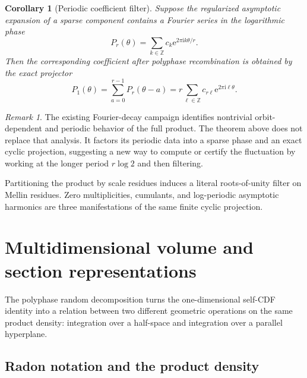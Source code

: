\documentclass[11pt,oneside]{article}
\numberwithin{equation}{section}
\newtheorem{corollary}[theorem]{Corollary}
\theoremstyle{definition}
\theoremstyle{remark}
\newtheorem{remark}[theorem]{Remark}
\newcommand{\Z}{\mathbb Z}
\newcommand{\e}{\mathrm e}
\newcommand{\ii}{\mathrm i}
\begin{document}
\begin{corollary}[Periodic coefficient filter]
\label{cor:periodic-filter}
Suppose the regularized asymptotic expansion of a sparse component contains a
Fourier series in the logarithmic phase
\begin{equation}
 P_r(\theta)=\sum_{k\in\Z}c_k\e^{2\pi\ii k\theta/r}.        \label{eq:Pr-phase}
\end{equation}
Then the corresponding coefficient after polyphase recombination is obtained
by the exact projector
\begin{equation}
 P_1(\theta)=\sum_{a=0}^{r-1}P_r(\theta-a)
 =r\sum_{\ell\in\Z}c_{r\ell}\e^{2\pi\ii\ell\theta}.       \label{eq:phase-projector}
\end{equation}
\end{corollary}

\begin{remark}
The existing Fourier-decay campaign identifies nontrivial orbit-dependent and
periodic behavior of the full product.  The theorem above does not replace that
analysis.  It factors its periodic data into a sparse phase and an exact cyclic
projection, suggesting a new way to compute or certify the fluctuation by
working at the longer period $r\log2$ and then filtering.
\end{remark}

\begin{resultbox}
Partitioning the product by scale residues induces a literal roots-of-unity
filter on Mellin residues.  Zero multiplicities, cumulants, and log-periodic
asymptotic harmonics are three manifestations of the same finite cyclic
projection.
\end{resultbox}

\section{Multidimensional volume and section representations}
\label{sec:sections}

The polyphase random decomposition turns the one-dimensional self-CDF identity
into a relation between two different geometric operations on the same product
density: integration over a half-space and integration over a parallel
hyperplane.

\subsection{Radon notation and the product density}
\end{document}
